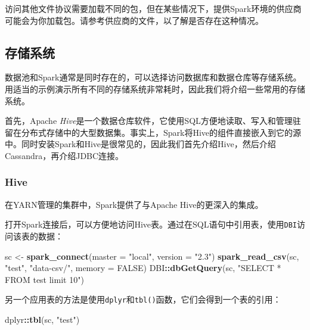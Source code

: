 \documentclass[
]{article}
\newenvironment{Shaded}{\begin{snugshade}}{\end{snugshade}}
\newcommand{\DataTypeTok}[1]{\textcolor[rgb]{0.13,0.29,0.53}{#1}}
\newcommand{\KeywordTok}[1]{\textcolor[rgb]{0.13,0.29,0.53}{\textbf{#1}}}
\newcommand{\NormalTok}[1]{#1}
\newcommand{\OperatorTok}[1]{\textcolor[rgb]{0.81,0.36,0.00}{\textbf{#1}}}
\newcommand{\OtherTok}[1]{\textcolor[rgb]{0.56,0.35,0.01}{#1}}
\newcommand{\StringTok}[1]{\textcolor[rgb]{0.31,0.60,0.02}{#1}}
\begin{document}
访问其他文件协议需要加载不同的包，但在某些情况下，提供Spark环境的供应商可能会为你加载包。请参考供应商的文件，以了解是否存在这种情况。

\hypertarget{ux5b58ux50a8ux7cfbux7edf}{%
\subsection{存储系统}\label{ux5b58ux50a8ux7cfbux7edf}}

数据池和Spark通常是同时存在的，可以选择访问数据库和数据仓库等存储系统。用适当的示例演示所有不同的存储系统非常耗时，因此我们将介绍一些常用的存储系统。

首先，Apache
\emph{Hive}是一个数据仓库软件，它使用SQL方便地读取、写入和管理驻留在分布式存储中的大型数据集。事实上，Spark将Hive的组件直接嵌入到它的源中。同时安装Spark和Hive是很常见的，因此我们首先介绍Hive，然后介绍Cassandra，再介绍JDBC连接。

\hypertarget{hive}{%
\subsubsection{Hive}\label{hive}}

在YARN管理的集群中，Spark提供了与Apache Hive的更深入的集成。

打开Spark连接后，可以方便地访问Hive表。通过在SQL语句中引用表，使用\texttt{DBI}访问该表的数据：

\begin{Shaded}
\begin{Highlighting}[]
\NormalTok{sc <-}\StringTok{ }\KeywordTok{spark_connect}\NormalTok{(}\DataTypeTok{master =} \StringTok{"local"}\NormalTok{, }\DataTypeTok{version =} \StringTok{"2.3"}\NormalTok{)}
\KeywordTok{spark_read_csv}\NormalTok{(sc, }\StringTok{"test"}\NormalTok{, }\StringTok{"data-csv/"}\NormalTok{, }\DataTypeTok{memory =} \OtherTok{FALSE}\NormalTok{)}
\NormalTok{DBI}\OperatorTok{::}\KeywordTok{dbGetQuery}\NormalTok{(sc, }\StringTok{"SELECT * FROM test limit 10"}\NormalTok{)}
\end{Highlighting}
\end{Shaded}

另一个应用表的方法是使用\texttt{dplyr}和\texttt{tbl()}函数，它们会得到一个表的引用：

\begin{Shaded}
\begin{Highlighting}[]
\NormalTok{dplyr}\OperatorTok{::}\KeywordTok{tbl}\NormalTok{(sc, }\StringTok{"test"}\NormalTok{)}
\end{Highlighting}
\end{Shaded}
\end{document}
